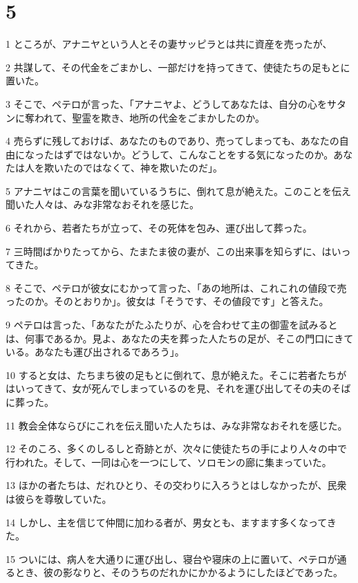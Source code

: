 \chapter{5}

\par 1 ところが、アナニヤという人とその妻サッピラとは共に資産を売ったが、
\par 2 共謀して、その代金をごまかし、一部だけを持ってきて、使徒たちの足もとに置いた。
\par 3 そこで、ペテロが言った、「アナニヤよ、どうしてあなたは、自分の心をサタンに奪われて、聖霊を欺き、地所の代金をごまかしたのか。
\par 4 売らずに残しておけば、あなたのものであり、売ってしまっても、あなたの自由になったはずではないか。どうして、こんなことをする気になったのか。あなたは人を欺いたのではなくて、神を欺いたのだ」。
\par 5 アナニヤはこの言葉を聞いているうちに、倒れて息が絶えた。このことを伝え聞いた人々は、みな非常なおそれを感じた。
\par 6 それから、若者たちが立って、その死体を包み、運び出して葬った。
\par 7 三時間ばかりたってから、たまたま彼の妻が、この出来事を知らずに、はいってきた。
\par 8 そこで、ペテロが彼女にむかって言った、「あの地所は、これこれの値段で売ったのか。そのとおりか」。彼女は「そうです、その値段です」と答えた。
\par 9 ペテロは言った、「あなたがたふたりが、心を合わせて主の御霊を試みるとは、何事であるか。見よ、あなたの夫を葬った人たちの足が、そこの門口にきている。あなたも運び出されるであろう」。
\par 10 すると女は、たちまち彼の足もとに倒れて、息が絶えた。そこに若者たちがはいってきて、女が死んでしまっているのを見、それを運び出してその夫のそばに葬った。
\par 11 教会全体ならびにこれを伝え聞いた人たちは、みな非常なおそれを感じた。
\par 12 そのころ、多くのしるしと奇跡とが、次々に使徒たちの手により人々の中で行われた。そして、一同は心を一つにして、ソロモンの廊に集まっていた。
\par 13 ほかの者たちは、だれひとり、その交わりに入ろうとはしなかったが、民衆は彼らを尊敬していた。
\par 14 しかし、主を信じて仲間に加わる者が、男女とも、ますます多くなってきた。
\par 15 ついには、病人を大通りに運び出し、寝台や寝床の上に置いて、ペテロが通るとき、彼の影なりと、そのうちのだれかにかかるようにしたほどであった。
